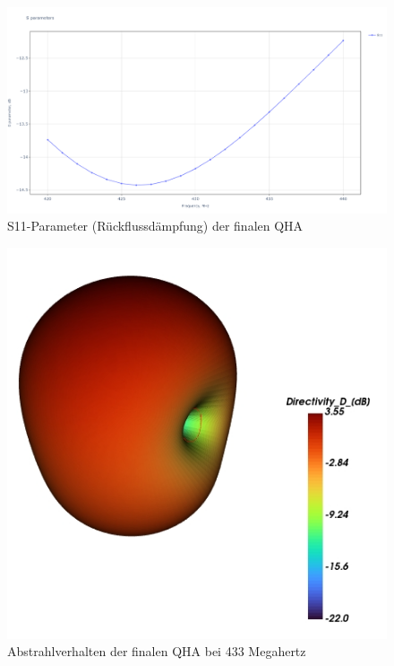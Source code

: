 \begin{figure} [H]
	\centering
	\includegraphics[width=\linewidth]{../ref/qfh_final_s11.png}
	\caption{S11-Parameter (Rückflussdämpfung) der finalen QHA}
	\label{fig:s11_final_qha}
\end{figure}

\begin{figure} [H]
	\centering
	\includegraphics[width=.75\linewidth]{../ref/radiation_pattern_final_qfh.png}
	\caption{Abstrahlverhalten der finalen QHA bei 433 Megahertz}
	\label{fig:rp_final_qha}
\end{figure}

